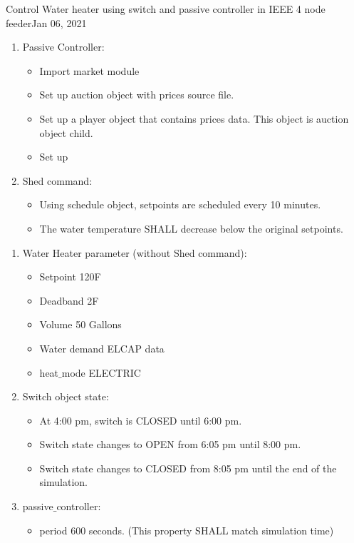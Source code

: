 \begin{entry}{Control Water heater using switch and passive controller in IEEE 4 node feeder}{Jan 06, 2021}
\begin{enumerate}
\begin{itemize}
        \end{itemize}
        \item Passive Controller:
        \begin{itemize}
            \item Import market module
            \item Set up auction object with prices source file.
            \item Set up a player object that contains prices data. This object is auction object child.
            \item Set up 
        \end{itemize}
        \item Shed command:
        \begin{itemize}
            \item Using schedule object, setpoints are scheduled every 10 minutes.
            \item The water temperature SHALL decrease below the original setpoints. 
        \end{itemize}
    \end{enumerate}
    \parameters
    \begin{enumerate}
        \item Water Heater parameter (without Shed command):
        \begin{itemize}
        \item Setpoint 120F
        \item Deadband 2F
        \item Volume 50 Gallons
        \item Water demand ELCAP data
        \item heat$\_$mode ELECTRIC
        \end{itemize}
        \item Switch object state:
            \begin{itemize}
                \item At 4:00 pm, switch is CLOSED until 6:00 pm.
                \item Switch state changes to OPEN from 6:05 pm until 8:00 pm.
                \item Switch state changes to CLOSED from 8:05 pm until the end of the simulation.
            \end{itemize}
        \item passive$\_$controller:
            \begin{itemize}
                \item period 600 seconds. (This property SHALL match simulation time)

\end{itemize}
\end{enumerate}
\end{entry}
